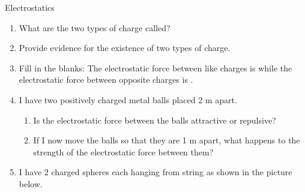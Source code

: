 % 
% 
            \begin{eocexercises}{Electrostatics}
            \nopagebreak
      \label{m38781*id202059}\begin{enumerate}[noitemsep, label=\textbf{\arabic*}. ] 
            \label{m38781*uid21}\item What are the two types of charge called?\newline
\label{m38781*uid22}\item Provide evidence for the existence of two types of charge.\newline
\label{m38781*uid23}\item Fill in the blanks: The electrostatic force between like charges is  \uline{\hspace{10ex}}
 while the electrostatic force between opposite charges is  \uline{\hspace{10ex}}
.\newline
\label{m38781*uid24}\item I have two positively charged metal balls placed 2 m apart.
\label{m38781*id202122}\begin{enumerate}[noitemsep, label=\textbf{\alph*}. ] 
            \label{m38781*uid25}\item Is the electrostatic force between the balls attractive or repulsive?
\label{m38781*uid26}\item If I now move the balls so that they are 1 m apart, what happens to the strength of the electrostatic force between them?
\end{enumerate}
        \newline
            \label{m38781*uid27}\item I have 2 charged spheres each hanging from string as shown in the picture below.
    \setcounter{subfigure}{0}
	\begin{figure}[H] %

\end{figure}
\end{enumerate}
\end{eocexercises}
